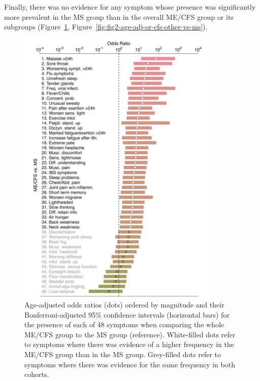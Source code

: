 Finally, there was no evidence for any symptom whose presence was significantly more prevalent in the MS group than in the overall ME/CFS group or its subgroups (Figure~\ref{fig:fig1-age-adj-or-cfs-all-vs-ms}, Figure~\ref{fig:fig2-age-adj-or-cfs-other-vs-ms}).

\begin{figure}
    \centering
    \includegraphics[width=0.85\textwidth]{chapter/2023-sym-and-herpesvirus/figures/fig1-age-adj-or-cfs-all-vs-ms.png}
    \caption[Age-adjusted OR for the presence of each of 48 symptoms when comparing the whole ME/CFS group to the MS group]{Age-adjusted odds ratios (dots) ordered by magnitude and their Bonferroni-adjusted 95\% confidence intervals (horizontal bars) for the presence of each of 48 symptoms when comparing the whole ME/CFS group to the MS group (reference). White-filled dots refer to symptoms where there was evidence of a higher frequency in the ME/CFS group than in the MS group. Grey-filled dots refer to symptoms where there was evidence for the same frequency in both cohorts.}
    \label{fig:fig1-age-adj-or-cfs-all-vs-ms}
\end{figure}

